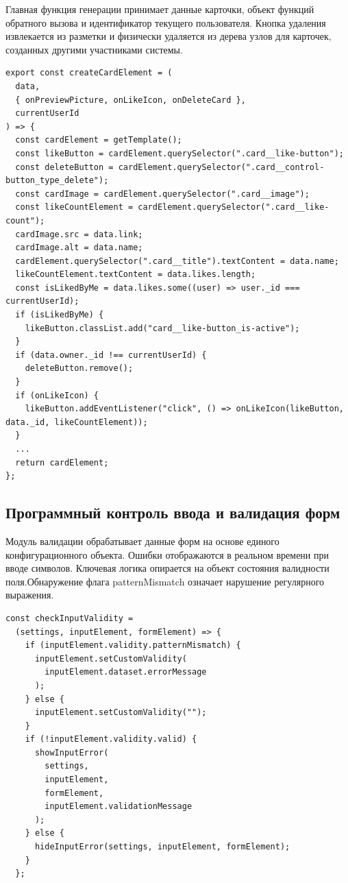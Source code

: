 \documentclass[bachelor, och, pract, times]{SCWorks}
\begin{document}
Главная функция генерации принимает данные карточки, объект функций обратного
вызова и идентификатор текущего пользователя. Кнопка удаления извлекается из
разметки и физически удаляется из дерева узлов для карточек, созданных другими
участниками системы.

\begin{verbatim}
export const createCardElement = (
  data,
  { onPreviewPicture, onLikeIcon, onDeleteCard },
  currentUserId
) => {
  const cardElement = getTemplate();
  const likeButton = cardElement.querySelector(".card__like-button");
  const deleteButton = cardElement.querySelector(".card__control-button_type_delete");
  const cardImage = cardElement.querySelector(".card__image");
  const likeCountElement = cardElement.querySelector(".card__like-count");
  cardImage.src = data.link;
  cardImage.alt = data.name;
  cardElement.querySelector(".card__title").textContent = data.name;
  likeCountElement.textContent = data.likes.length;
  const isLikedByMe = data.likes.some((user) => user._id === currentUserId);
  if (isLikedByMe) {
    likeButton.classList.add("card__like-button_is-active");
  }
  if (data.owner._id !== currentUserId) {
    deleteButton.remove();
  }
  if (onLikeIcon) {
    likeButton.addEventListener("click", () => onLikeIcon(likeButton, data._id, likeCountElement));
  }
  ...
  return cardElement;
};
\end{verbatim}

\subsection{Программный контроль ввода и валидация форм}
Модуль валидации обрабатывает данные форм на основе единого конфигурационного
объекта. Ошибки отображаются в реальном времени при вводе символов. Ключевая
логика опирается на объект состояния валидности поля.Обнаружение флага
patternMismatch означает нарушение регулярного выражения\cite{mdn_validity_state}.

\begin{verbatim}
const checkInputValidity =
  (settings, inputElement, formElement) => {
    if (inputElement.validity.patternMismatch) {
      inputElement.setCustomValidity(
        inputElement.dataset.errorMessage
      );
    } else {
      inputElement.setCustomValidity("");
    }
    if (!inputElement.validity.valid) {
      showInputError(
        settings,
        inputElement,
        formElement,
        inputElement.validationMessage
      );
    } else {
      hideInputError(settings, inputElement, formElement);
    }
  };
\end{verbatim}
\end{document}
